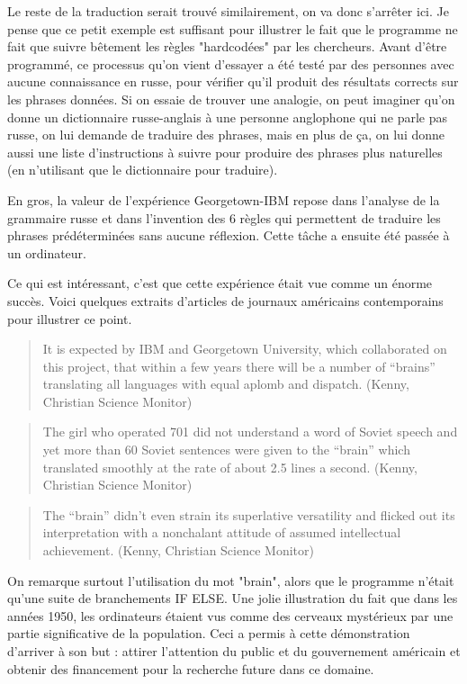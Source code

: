 \documentclass[11pt, a4paper]{report}
\begin{document}
Le reste de la traduction serait trouvé similairement, on va donc s'arrêter ici. Je pense que ce 
petit exemple est suffisant pour illustrer le fait que le programme ne fait que suivre bêtement les 
règles "hardcodées" par les chercheurs. Avant d'être programmé, ce processus qu'on vient d'essayer 
a été testé par des personnes avec aucune connaissance en russe, pour vérifier qu'il produit des 
résultats corrects sur les phrases données. Si on essaie de trouver une analogie, on peut imaginer
qu'on donne un dictionnaire russe-anglais à une personne anglophone qui ne parle pas russe, on lui demande 
de traduire des phrases, mais en plus de ça, on lui donne aussi une liste d'instructions à suivre 
pour produire des phrases plus naturelles (en n'utilisant que le dictionnaire pour traduire). 

En gros, la valeur de l'expérience Georgetown-IBM repose dans l'analyse de la grammaire russe et dans 
l'invention des 6 règles qui permettent de traduire les phrases prédéterminées sans aucune réflexion. 
Cette tâche a ensuite été passée à un ordinateur. 

Ce qui est intéressant, c'est que cette expérience était vue comme un énorme succès. Voici quelques 
extraits d'articles de journaux américains contemporains pour illustrer ce point.
\begin{quote} 
It is expected by IBM and Georgetown University, which collaborated on this project,
that within a few years there will be a number of “brains” translating all languages
with equal aplomb and dispatch. (Kenny, Christian Science Monitor)
\end{quote}

\begin{quote}
The girl who operated 701 did not understand a word of Soviet speech and yet more
than 60 Soviet sentences were given to the “brain” which translated smoothly at the
rate of about 2.5 lines a second. (Kenny, Christian Science Monitor)
\end{quote}

\begin{quote}
The “brain” didn’t even strain its superlative versatility and flicked out its
interpretation with a nonchalant attitude of assumed intellectual achievement. (Kenny,
Christian Science Monitor)
\end{quote}

On remarque surtout l'utilisation du mot "brain", alors que le programme n'était qu'une suite 
de branchements IF ELSE. Une jolie illustration du fait que dans les années 1950, les ordinateurs 
étaient vus comme des cerveaux mystérieux par une partie significative de la population. 
Ceci a permis à cette démonstration d'arriver à son but : attirer l'attention du public et du 
gouvernement américain et obtenir des financement pour 
la recherche future dans ce domaine. 
  
\end{document}
